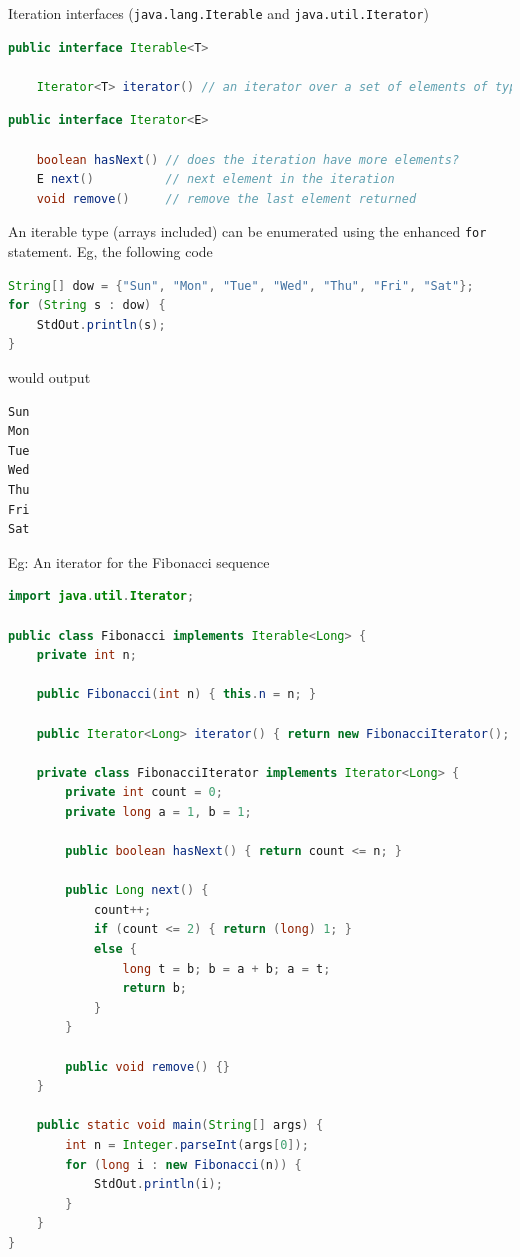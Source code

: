 \documentclass[8pt,a4paper,compress]{beamer}
\begin{document}
\begin{frame}[fragile]
\pause

Iteration interfaces (\lstinline$java.lang.Iterable$ and \lstinline$java.util.Iterator$)
\begin{lstlisting}[language=Java]
public interface Iterable<T>

    Iterator<T> iterator() // an iterator over a set of elements of type T
\end{lstlisting}

\begin{lstlisting}[language=Java]
public interface Iterator<E>

    boolean hasNext() // does the iteration have more elements?
    E next()          // next element in the iteration
    void remove()     // remove the last element returned
\end{lstlisting}

An iterable type (arrays included) can be enumerated using the enhanced \lstinline$for$ statement. Eg, the following code 

\begin{lstlisting}[language=Java]
String[] dow = {"Sun", "Mon", "Tue", "Wed", "Thu", "Fri", "Sat"};
for (String s : dow) {
    StdOut.println(s);
}
\end{lstlisting}

would output

\begin{lstlisting}[language=Java]
Sun
Mon
Tue
Wed
Thu
Fri
Sat
\end{lstlisting}
\end{frame}

\begin{frame}[fragile]
\pause

Eg: An iterator for the Fibonacci sequence

\begin{lstlisting}[language=Java]
import java.util.Iterator;

public class Fibonacci implements Iterable<Long> {
    private int n;

    public Fibonacci(int n) { this.n = n; }

    public Iterator<Long> iterator() { return new FibonacciIterator(); }

    private class FibonacciIterator implements Iterator<Long> {
        private int count = 0;
        private long a = 1, b = 1;

        public boolean hasNext() { return count <= n; }

        public Long next() {
            count++;
            if (count <= 2) { return (long) 1; }
            else { 
                long t = b; b = a + b; a = t;
                return b;
            }
        }
        
        public void remove() {}
    }

    public static void main(String[] args) {
        int n = Integer.parseInt(args[0]);
        for (long i : new Fibonacci(n)) {
            StdOut.println(i);
        }
    }
}
\end{lstlisting}
\end{frame}
\end{document}
